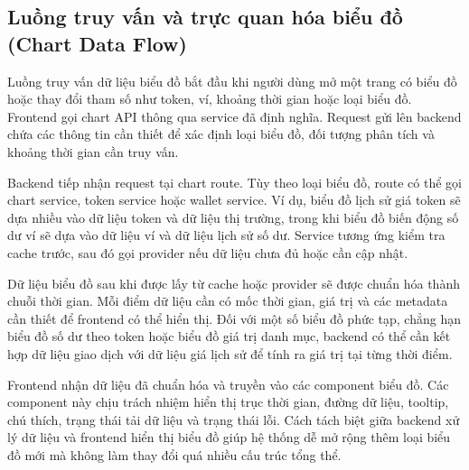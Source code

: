 


\subsection{Luồng truy vấn và trực quan hóa biểu đồ (Chart Data Flow)}

Luồng truy vấn dữ liệu biểu đồ bắt đầu khi người dùng mở một trang có biểu đồ hoặc thay đổi tham số như token, ví, khoảng thời gian hoặc loại biểu đồ. Frontend gọi chart API thông qua service đã định nghĩa. Request gửi lên backend chứa các thông tin cần thiết để xác định loại biểu đồ, đối tượng phân tích và khoảng thời gian cần truy vấn.

Backend tiếp nhận request tại chart route. Tùy theo loại biểu đồ, route có thể gọi chart service, token service hoặc wallet service. Ví dụ, biểu đồ lịch sử giá token sẽ dựa nhiều vào dữ liệu token và dữ liệu thị trường, trong khi biểu đồ biến động số dư ví sẽ dựa vào dữ liệu ví và dữ liệu lịch sử số dư. Service tương ứng kiểm tra cache trước, sau đó gọi provider nếu dữ liệu chưa đủ hoặc cần cập nhật.

Dữ liệu biểu đồ sau khi được lấy từ cache hoặc provider sẽ được chuẩn hóa thành chuỗi thời gian. Mỗi điểm dữ liệu cần có mốc thời gian, giá trị và các metadata cần thiết để frontend có thể hiển thị. Đối với một số biểu đồ phức tạp, chẳng hạn biểu đồ số dư theo token hoặc biểu đồ giá trị danh mục, backend có thể cần kết hợp dữ liệu giao dịch với dữ liệu giá lịch sử để tính ra giá trị tại từng thời điểm.

Frontend nhận dữ liệu đã chuẩn hóa và truyền vào các component biểu đồ. Các component này chịu trách nhiệm hiển thị trục thời gian, đường dữ liệu, tooltip, chú thích, trạng thái tải dữ liệu và trạng thái lỗi. Cách tách biệt giữa backend xử lý dữ liệu và frontend hiển thị biểu đồ giúp hệ thống dễ mở rộng thêm loại biểu đồ mới mà không làm thay đổi quá nhiều cấu trúc tổng thể.


